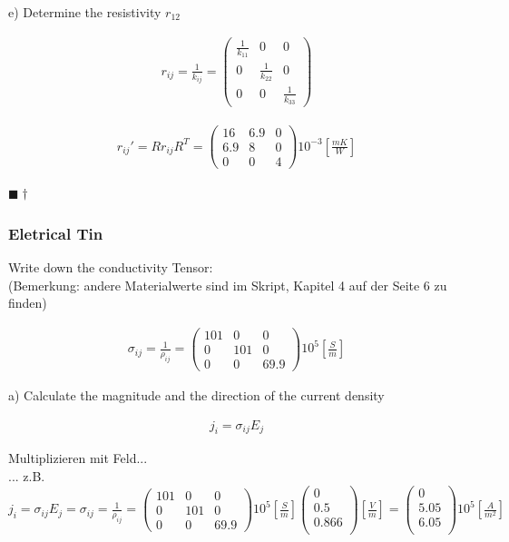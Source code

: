 \documentclass[a4paper]{scrartcl}
\newcommand{\qed}{\begin{flushright}
$\blacksquare \dagger$ \end{flushright}}
\begin{document}
e) Determine the resistivity $r_{12}$

\begin{align}
r_{ij}=\frac{1}{k_{ij}}=\begin{pmatrix}
\frac{1}{k_{11}} & 0 & 0 \\
0 & \frac{1}{k_{22}} & 0 \\
0 & 0 & \frac{1}{k_{33}}
\end{pmatrix}
\end{align}

\begin{align}
r_{ij}'=Rr_{ij}R^{T} = \begin{pmatrix}
16 & 6.9 & 0 \\
6.9 & 8 & 0 \\
0 & 0 & 4
\end{pmatrix}
10^{-3}[\frac{mK}{W}] 
\end{align}
\qed




\subsubsection{Eletrical Tin}
Write down the conductivity Tensor:\\
(Bemerkung: andere Materialwerte sind im Skript, Kapitel 4 auf der Seite 6 zu finden)

\begin{align}
\sigma_{ij} = \frac{1}{\rho_{ij}}= \begin{pmatrix}
101 & 0 & 0 \\
0 & 101 & 0 \\
0 & 0 & 69.9 
\end{pmatrix}
10^5 [\frac{S}{m}]
\end{align}



a) Calculate the magnitude and the direction of the current density

\begin{align}
j_i=\sigma_{ij}E_j
\end{align}

Multiplizieren mit Feld...
\\... z.B. $ j_i=\sigma_{ij}E_j = \sigma_{ij} = \frac{1}{\rho_{ij}}= \begin{pmatrix}
101 & 0 & 0 \\
0 & 101 & 0 \\
0 & 0 & 69.9 
\end{pmatrix} 10^5 [\frac{S}{m}] 
\begin{pmatrix}
0 \\
0.5 \\
0.866 \\
\end{pmatrix} [\frac{V}{m}] = 
\begin{pmatrix}
0 \\
5.05 \\
6.05 \\
\end{pmatrix} 10^5 [\frac{A}{m^2}]$
\end{document}
